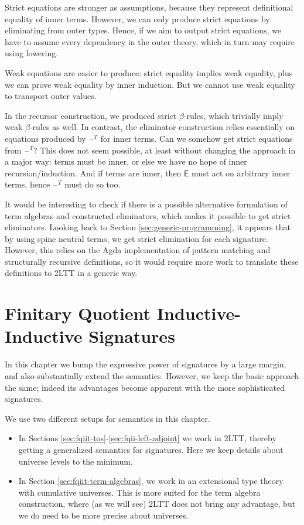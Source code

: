 \documentclass[12pt,a4paper,twoside,openany]{book}
\theoremstyle{remark}
\theoremstyle{definition}
\theoremstyle{theorem}
\newcommand{\ms}[1]{\mathsf{#1}}
\newcommand{\blank}{\mathord{\hspace{1pt}\text{--}\hspace{1pt}}}
\begin{document}
Strict equations are stronger as assumptions, because they represent
definitional equality of inner terms. However, we can only produce strict
equations by eliminating from outer types. Hence, if we aim to output strict
equations, we have to assume every dependency in the outer theory, which in turn
may require using lowering.

Weak equations are easier to produce: strict equality implies weak equality,
plus we can prove weak equality by inner induction. But we cannot use weak
equality to transport outer values.

In the recursor construction, we produced strict $\beta$-rules, which trivially
imply weak $\beta$-rules as well. In contrast, the eliminator construction
relies essentially on equations produced by $\blank^T$ for inner terms. Can we
somehow get strict equations from $\blank^T$? This does not seem possible, at
least without changing the approach in a major way: terms must be inner, or else
we have no hope of inner recursion/induction. And if terms are inner, then
$\ms{E}$ must act on arbitrary inner terms, hence $\blank^T$ must do so too.

It would be interesting to check if there is a possible alternative formulation of
term algebras and constructed eliminators, which makes it possible to get strict
eliminators. Looking back to Section \ref{sec:generic-programming}, it appears
that by using spine neutral terms, we get strict elimination for each
signature. However, this relies on the Agda implementation of pattern matching
and structurally recursive definitions, so it would require more work to translate
these definitions to 2LTT in a generic way.

\chapter[Finitary QII Signatures]{Finitary Quotient Inductive-Inductive Signatures}
\label{chap:fqiit}

In this chapter we bump the expressive power of signatures by a large margin,
and also substantially extend the semantics. However, we keep the basic approach
the same; indeed its advantages become apparent with the more sophisticated
signatures.

We use two different setups for semantics in this chapter.
\begin{itemize}
  \item In Sections \ref{sec:fqiit-tos}-\ref{sec:fqii-left-adjoint} we work in 2LTT, thereby
        getting a generalized semantics for signatures. Here we keep details about universe
        levels to the minimum.
  \item In Section \ref{sec:fqiit-term-algebras}, we work in an
        extensional type theory with cumulative universes. This is more suited for the term
        algebra construction, where (as we will see) 2LTT does not bring any advantage, but
        we do need to be more precise about universes.
\end{itemize}
\end{document}
